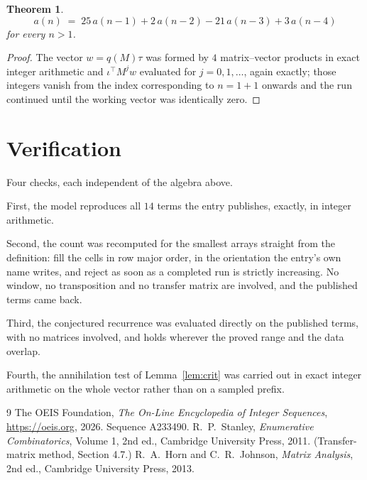 \documentclass[11pt,a4paper]{article}
\theoremstyle{plain}
\newtheorem{theorem}{Theorem}
\theoremstyle{definition}
\begin{document}
\begin{theorem}
\[
a(n)\;=\;25\,a(n-1) + 2\,a(n-2) - 21\,a(n-3) + 3\,a(n-4)
\]
for every $n>1$.
\end{theorem}

\begin{proof}
The vector $w=q(M)\tau$ was formed by $4$ matrix--vector products in exact integer
arithmetic and $\iota^{\!\top}M^{j}w$ evaluated for $j=0,1,\dots$, again exactly; those
integers vanish from the index corresponding to $n=1+1$ onwards and the run continued
until the working vector was identically zero.
\end{proof}

\section{Verification}

Four checks, each independent of the algebra above.

First, the model reproduces all $14$ terms the entry publishes, exactly, in integer
arithmetic.

Second, the count was recomputed for the smallest arrays straight from the definition: fill the
cells in row major order, in the orientation the entry's own name writes, and reject as soon as
a completed run is strictly increasing. No window, no transposition and no transfer matrix are involved, and
the published terms came back.

Third, the conjectured recurrence was evaluated directly on the published terms, with no
matrices involved, and holds wherever the proved range and the data overlap.

Fourth, the annihilation test of Lemma~\ref{lem:crit} was carried out in exact integer
arithmetic on the whole vector rather than on a sampled prefix.

\begin{thebibliography}{9}
 The OEIS Foundation, \emph{The On-Line Encyclopedia of Integer
Sequences}, \url{https://oeis.org}, 2026. Sequence A233490.
 R.~P.~Stanley, \emph{Enumerative Combinatorics}, Volume 1, 2nd ed.,
Cambridge University Press, 2011. (Transfer-matrix method, Section 4.7.)
 R.~A.~Horn and C.~R.~Johnson, \emph{Matrix Analysis}, 2nd ed., Cambridge
University Press, 2013.
\end{thebibliography}
\end{document}
